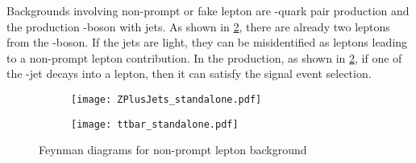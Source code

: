 Backgrounds involving non-prompt or fake lepton are \Ptop-quark pair production 
and the production \PZ-boson with jets. 
As shown in \cref{fig:fakefeynb}, there are already two leptons
from the \PZ-boson. If the jets are light, they can be misidentified as leptons leading to 
a non-prompt lepton contribution.
In the \Ptop{}\APtop production, as shown in \cref{fig:fakefeynb}, if one of the \Pbottom-jet decays 
into a lepton, then it can satisfy the signal event selection.


\begin{figure}[htbp]
  \centering
  \begin{subfigure}{0.45\figwidth}
    \centering
    \texttt{[image: ZPlusJets\_standalone.pdf]}
    \caption{}
    \label{fig:fakefeyna}
  \end{subfigure}
  \begin{subfigure}{0.45\figwidth}
    \centering
    \texttt{[image: ttbar\_standalone.pdf]}
    \caption{}
    \label{fig:fakefeynb}
  \end{subfigure}
  \caption[Feynman diagrams for non-prompt lepton backgrounds]{Feynman diagrams for non-prompt lepton background}
  \label{fig:fakefeyn}
  \end{figure}